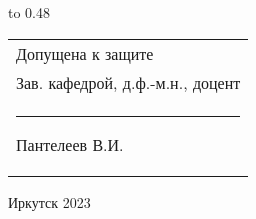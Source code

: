 \vspace{0.8cm}

{
	\noindent\hbox to 0.48\textwidth {%
		\mbox{ } \hfil} %
	\begin{tabular}[t]{l}
		Допущена к защите\\
		Зав. кафедрой, д.ф.-м.н., доцент \\
		\rule{2.7cm}{0.5pt} Пантелеев В.И.
	\end{tabular}		
}

\vspace{0.8cm}

\vfill 
\noindent
\begin{minipage}{\textwidth}
	\centering	Иркутск 2023
\end{minipage}